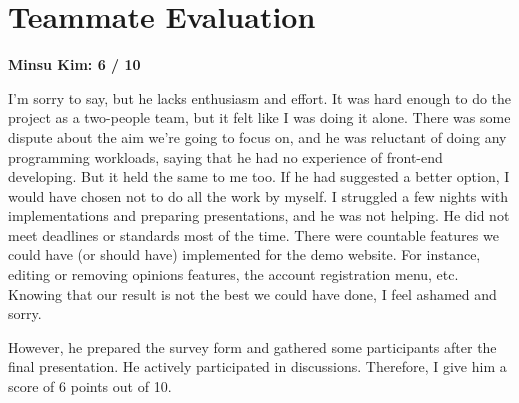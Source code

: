 \documentclass[10pt,a4paper]{article}
\begin{document}
	\section{Teammate Evaluation }
	\textbf{Minsu Kim:  6 / 10}
	
	I'm sorry to say, but he lacks enthusiasm and effort. It was hard enough to do the project as a two-people team, but it felt like I was doing it alone. There was some dispute about the aim we're going to focus on, and he was reluctant of doing any programming workloads, saying that he had no experience of front-end developing. But it held the same to me too. If he had suggested a better option, I would have chosen not to do all the work by myself. I struggled a few nights with implementations and preparing presentations, and he was not helping. He did not meet deadlines or standards most of the time. There were countable features we could have (or should have) implemented for the demo website. For instance, editing or removing opinions features, the account registration menu, etc. Knowing that our result is not the best we could have done, I feel ashamed and sorry.
	
	However, he prepared the survey form and gathered some participants after the final presentation. He actively participated in discussions. Therefore, I give him a score of 6 points out of 10.
\end{document}
